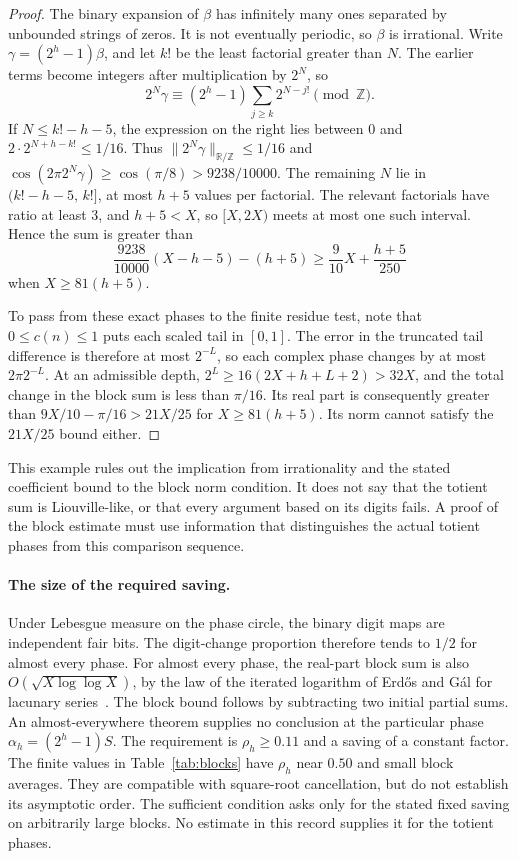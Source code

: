 \begin{proof}
The binary expansion of $\beta$ has infinitely many ones separated by
unbounded strings of zeros. It is not eventually periodic, so $\beta$ is
irrational. Write $\gamma=(2^h-1)\beta$, and let $k!$ be the least
factorial greater than $N$. The earlier terms become integers after
multiplication by $2^N$, so
\[
 2^N\gamma\equiv(2^h-1)\sum_{j\ge k}2^{N-j!}\pmod{\mathbb Z}.
\]
If $N\le k!-h-5$, the expression on the right lies between $0$ and
$2\cdot2^{N+h-k!}\le1/16$. Thus $\|2^N\gamma\|_{\mathbb R/\mathbb Z}\le1/16$ and
$\cos(2\pi 2^{N}\gamma)\ge\cos(\pi/8)>9238/10000$. The remaining $N$
lie in $(k!-h-5,\,k!]$, at most $h+5$ values per factorial. The relevant
factorials have ratio at least $3$, and $h+5<X$, so $[X,2X)$ meets at
most one such interval. Hence the sum is greater than
\[
 \frac{9238}{10000}(X-h-5)-(h+5)\ge\frac9{10}X+\frac{h+5}{250}
\]
when $X\ge81(h+5)$.

To pass from these exact phases to the finite residue test, note that
$0\le c(n)\le1$ puts each scaled tail in $[0,1]$. The error in the
truncated tail difference is therefore at most $2^{-L}$, so each complex
phase changes by at most $2\pi2^{-L}$. At an admissible depth,
$2^L\ge16(2X+h+L+2)>32X$, and the total change in the block sum is less
than $\pi/16$. Its real part is consequently greater than
$9X/10-\pi/16>21X/25$ for $X\ge81(h+5)$. Its norm cannot satisfy the
$21X/25$ bound either.
\end{proof}

\noindent
This example rules out the implication from irrationality and the stated
coefficient bound to the block norm condition. It does not say that the
totient sum is Liouville-like, or that every argument based on its digits
fails. A proof of the block estimate must use information that distinguishes
the actual totient phases from this comparison sequence.

\paragraph{The size of the required saving.}
Under Lebesgue measure on the phase circle, the binary digit maps are
independent fair bits. The digit-change proportion therefore tends to
$1/2$ for almost every phase. For almost every phase, the real-part block
sum is also $O(\sqrt{X\log\log X})$, by the law of the iterated logarithm of
Erd\H{o}s and G\'al for lacunary series~\cite[p.~65]{erdos-gal}.
The block bound follows by subtracting two initial partial sums.
An almost-everywhere theorem supplies no conclusion at the particular
phase $\alpha_h=(2^h-1)S$. The requirement is $\rho_h\ge 0.11$ and a saving of a constant
factor. The finite values in Table~\ref{tab:blocks} have $\rho_h$ near $0.50$
and small block averages. They are compatible with square-root
cancellation, but do not establish its asymptotic order. The sufficient
condition asks only for the stated fixed saving on arbitrarily large
blocks. No estimate in this record supplies it for the totient phases.

